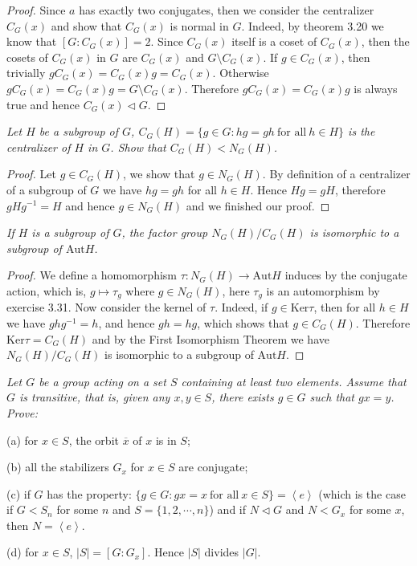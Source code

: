 \begin{proof}
Since $a$ has exactly two conjugates, then we consider the centralizer $C_G(x)$ and show that $C_G(x)$ is normal in $G$. Indeed, by theorem 3.20 we know that $[G:C_G(x)]=2$. Since $C_G(x)$ itself is a coset of $C_G(x)$, then the cosets of $C_G(x)$ in $G$ are $C_G(x)$ and $G\setminus C_G(x)$. If $g\in C_G(x)$, then trivially $gC_G(x)=C_G(x)g=C_G(x)$. Otherwise $gC_G(x)=C_G(x)g=G\setminus C_G(x)$. Therefore $gC_G(x)=C_G(x)g$ is always true and hence $C_G(x)\lhd G$.
\end{proof}
\begin{problem}\em
Let $H$ be a subgroup of $G$, $C_G(H)=\{g\in G:hg=gh\ \text{for all}\ h\in H\}$ is the centralizer of $H$ in $G$. Show that $C_G(H)<N_G(H)$.
\end{problem}
\begin{proof}
Let $g\in C_G(H)$, we show that $g\in N_G(H)$. By definition of a centralizer of a subgroup of $G$ we have $hg=gh$ for all $h\in H$. Hence $Hg=gH$, therefore $gHg^{-1}=H$ and hence $g\in N_G(H)$ and we finished our proof.
\end{proof}
\begin{problem}\em
If $H$ is a subgroup of $G$, the factor group $N_G(H)/C_G(H)$ is isomorphic to a subgroup of $\mathrm{Aut}H$.
\end{problem}
\begin{proof}
We define a homomorphism $\tau:N_G(H)\to\mathrm{Aut}H$ induces by the conjugate action, which is, $g\mapsto\tau_g$ where $g\in N_G(H)$, here $\tau_g$ is an automorphism by exercise 3.31. Now consider the kernel of $\tau$. Indeed, if $g\in\mathrm{Ker}\tau$, then for all $h\in H$ we have $ghg^{-1}=h$, and hence $gh=hg$, which shows that $g\in C_G(H)$. Therefore $\mathrm{Ker}\tau=C_G(H)$ and by the First Isomorphism Theorem we have $N_G(H)/C_G(H)$ is isomorphic to a subgroup of $\mathrm{Aut}H$.
\end{proof}
\begin{problem}\em
Let $G$ be a group acting on a set $S$ containing at least two elements. Assume that $G$ is transitive, that is, given any $x,y\in S$, there exists $g\in G$ such that $gx=y$. Prove:\par
(a) for $x\in S$, the orbit $\overline{x}$ of $x$ is in $S$;\par
(b) all the stabilizers $G_x$ for $x\in S$ are conjugate;\par
(c) if $G$ has the property: $\{g\in G:gx=x\ \text{for all}\ x\in S\}=\left<e\right>$ (which is the case if $G<S_n$ for some $n$ and $S=\{1,2,\cdots,n\}$) and if $N\lhd G$ and $N<G_x$ for some $x$, then $N=\left<e\right>$.\par
(d) for $x\in S$, $|S|=[G:G_x]$. Hence $|S|$ divides $|G|$.
\end{problem}
